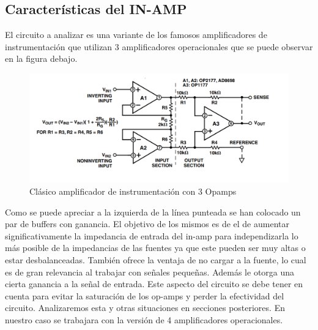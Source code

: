 	\subsection{Características del IN-AMP}
	El circuito a analizar es una variante de los famosos amplificadores de instrumentación que utilizan 3 amplificadores operacionales que se puede observar en la figura debajo.
	\begin{figure}[H]
		\centering		
		\includegraphics[width=\linewidth]{./ImagenesVarias/inAmp3Opamp}
		\caption{Clásico amplificador de instrumentación con 3 Opamps}
	\end{figure}
		
	Como se puede apreciar a la izquierda de la línea punteada se han colocado un par de buffers con ganancia. El objetivo de los mismos es de el de aumentar significativamente la impedancia de entrada del in-amp para independizarla lo más posible de la impedancias de las fuentes ya que este pueden ser muy altas o estar desbalanceadas. También ofrece la ventaja de no cargar a la fuente, lo cual es de gran relevancia al trabajar con señales pequeñas. Además le otorga una cierta ganancia a la señal de entrada. Este aspecto del circuito se debe tener en cuenta para evitar la saturación de los op-amps y perder la efectividad del circuito. Analizaremos esta y otras situaciones en secciones posteriores.
	En nuestro caso se trabajara con la versión de 4 amplificadores operacionales.
	
